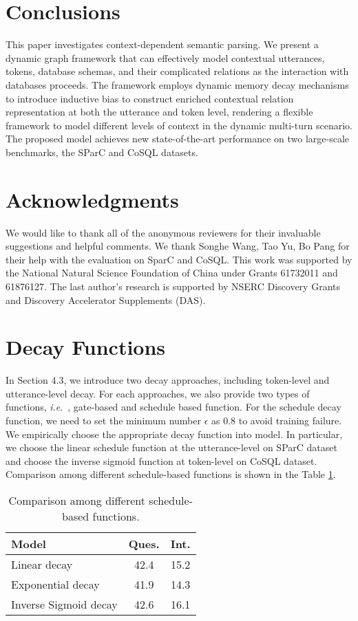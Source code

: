 \documentclass[letterpaper]{article} \usepackage{aaai21}  \usepackage{times}  \usepackage{helvet} \usepackage{courier}  \usepackage[hyphens]{url}  \usepackage{graphicx} \urlstyle{rm} \def\UrlFont{\rm}  \usepackage{natbib}  \usepackage{caption} \frenchspacing  \setlength{\pdfpagewidth}{8.5in}  \setlength{\pdfpageheight}{11in}
\def\ie{\emph{i.e}.~}
\begin{document}
\section{Conclusions}
This paper investigates context-dependent semantic parsing. We present a dynamic graph framework that can effectively model contextual utterances, tokens, database schemas, and their complicated relations as the interaction with databases proceeds.
The framework employs dynamic memory decay mechanisms to introduce inductive bias to construct enriched contextual relation representation at both the utterance and token level, rendering a flexible framework to model different levels of context in the dynamic multi-turn scenario. The proposed model achieves new state-of-the-art  performance on two large-scale benchmarks, the SParC and CoSQL datasets. 

\section*{Acknowledgments}
We would like to thank all of the anonymous reviewers for their invaluable suggestions and helpful comments.
We thank Songhe Wang, Tao Yu, Bo Pang for their help with the evaluation on SparC and CoSQL. 
This work was supported by the National Natural Science Foundation of China under Grants 61732011 and 61876127.
The last author's research is supported by NSERC Discovery Grants and Discovery Accelerator Supplements (DAS).




\clearpage
\appendix

\section{Decay Functions}
In Section 4.3, we introduce two decay approaches, including token-level and utterance-level decay.
For each approaches, we also provide two types of functions, \ie, gate-based and schedule based function. For the schedule decay function, we need to set the minimum number $\epsilon$ as $0.8$ to avoid training failure.
We empirically choose the appropriate decay function into model.
In particular, we choose the linear schedule function at the utterance-level on SParC dataset and choose the  inverse sigmoid function at token-level on CoSQL dataset. 
Comparison among different schedule-based functions is shown in the Table \ref{decay_app}.

\begin{table}[!htbp]
	\centering
	\begin{tabular}{lcc}
		\toprule 
		\textbf{Model} & {Ques.} & {Int.} \\
		\midrule
		Linear decay & 42.4 & 15.2  \\
		Exponential decay & 41.9 & 14.3  \\
		Inverse Sigmoid decay & 42.6 & 16.1 \\
		\bottomrule
	\end{tabular}
	\caption{Comparison among different schedule-based functions.}
	\label{decay_app}
\end{table}
\end{document}
